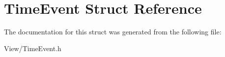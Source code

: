 \hypertarget{struct_time_event}{}\section{Time\+Event Struct Reference}
\label{struct_time_event}


The documentation for this struct was generated from the following file\+:\begin{DoxyCompactItemize}
\item 
View/Time\+Event.\+h\end{DoxyCompactItemize}
